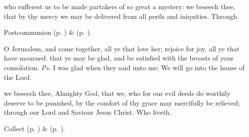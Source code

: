 
\vspace{-0.25\baselineskip}

\postcommunion
{} who sufferest us to be made partakers of so great a mystery: we beseech thee, that by thy mercy we may be delivered from all perils and iniquities. Through.

\begin{rubric}
     Postcommunion  (p. \pageref{AshWednesdayMassPostcommunion}) \&   (p. \pageref{SPLivingDeparted}).
\end{rubric}




\vspace{-0.25\baselineskip}

\introit
{} O Jerusalem, and come together, all ye that love her; rejoice for joy, all ye that have mourned: that ye may be glad, and be satisfied with the breasts of your consolation. \textit{Ps.} I was glad when they said unto me: We will go into the house of the Lord.

\vspace{-0.25\baselineskip}

\collect
{} we beseech thee, Almighty God, that we, who for our evil deeds do worthily deserve to be punished, by the comfort of thy grace may mercifully be relieved; through our Lord and Saviour Jesus Christ. Who liveth.

\begin{rubric}
     Collect  (p. \pageref{AshWednesdayMassCollect}) \&   (p. \pageref{SPLivingDeparted}).
\end{rubric}

\vspace{-0.25\baselineskip}

